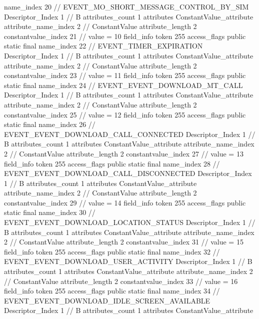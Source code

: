 {{{{{				name_index	20		// EVENT_MO_SHORT_MESSAGE_CONTROL_BY_SIM
				Descriptor_Index	1		// B
				attributes_count	1
				attributes {
				ConstantValue_attribute {
					attribute_name_index	2		// ConstantValue
					attribute_length	2
					constantvalue_index	21		// value = 10
				}
				}
			}
			field_info {
				token	255
				access_flags	public static final
				name_index	22		// EVENT_TIMER_EXPIRATION
				Descriptor_Index	1		// B
				attributes_count	1
				attributes {
				ConstantValue_attribute {
					attribute_name_index	2		// ConstantValue
					attribute_length	2
					constantvalue_index	23		// value = 11
				}
				}
			}
			field_info {
				token	255
				access_flags	public static final
				name_index	24		// EVENT_EVENT_DOWNLOAD_MT_CALL
				Descriptor_Index	1		// B
				attributes_count	1
				attributes {
				ConstantValue_attribute {
					attribute_name_index	2		// ConstantValue
					attribute_length	2
					constantvalue_index	25		// value = 12
				}
				}
			}
			field_info {
				token	255
				access_flags	public static final
				name_index	26		// EVENT_EVENT_DOWNLOAD_CALL_CONNECTED
				Descriptor_Index	1		// B
				attributes_count	1
				attributes {
				ConstantValue_attribute {
					attribute_name_index	2		// ConstantValue
					attribute_length	2
					constantvalue_index	27		// value = 13
				}
				}
			}
			field_info {
				token	255
				access_flags	public static final
				name_index	28		// EVENT_EVENT_DOWNLOAD_CALL_DISCONNECTED
				Descriptor_Index	1		// B
				attributes_count	1
				attributes {
				ConstantValue_attribute {
					attribute_name_index	2		// ConstantValue
					attribute_length	2
					constantvalue_index	29		// value = 14
				}
				}
			}
			field_info {
				token	255
				access_flags	public static final
				name_index	30		// EVENT_EVENT_DOWNLOAD_LOCATION_STATUS
				Descriptor_Index	1		// B
				attributes_count	1
				attributes {
				ConstantValue_attribute {
					attribute_name_index	2		// ConstantValue
					attribute_length	2
					constantvalue_index	31		// value = 15
				}
				}
			}
			field_info {
				token	255
				access_flags	public static final
				name_index	32		// EVENT_EVENT_DOWNLOAD_USER_ACTIVITY
				Descriptor_Index	1		// B
				attributes_count	1
				attributes {
				ConstantValue_attribute {
					attribute_name_index	2		// ConstantValue
					attribute_length	2
					constantvalue_index	33		// value = 16
				}
				}
			}
			field_info {
				token	255
				access_flags	public static final
				name_index	34		// EVENT_EVENT_DOWNLOAD_IDLE_SCREEN_AVAILABLE
				Descriptor_Index	1		// B
				attributes_count	1
				attributes {
				ConstantValue_attribute {
}}}}}}}
